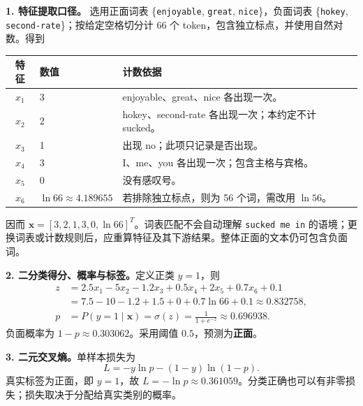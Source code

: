 \begin{checkedsolution}
\textbf{1. 特征提取口径。}
选用正面词表 \{\texttt{enjoyable}, \texttt{great}, \texttt{nice}\}，负面词表 \{\texttt{hokey}, \texttt{second-rate}\}；按给定空格切分计 66 个 token，包含独立标点，并使用自然对数。得到
\begin{center}
\small
\begin{tabularx}{\textwidth}{@{}c l X@{}}
\toprule
特征 & 数值 & 计数依据 \\
\midrule
$x_1$ & 3 & enjoyable、great、nice 各出现一次。\\
$x_2$ & 2 & hokey、second-rate 各出现一次；本约定不计 sucked。\\
$x_3$ & 1 & 出现 no；此项只记录是否出现。\\
$x_4$ & 3 & I、me、you 各出现一次；包含主格与宾格。\\
$x_5$ & 0 & 没有感叹号。\\
$x_6$ & $\ln66\approx4.189655$ & 若排除独立标点，则为 56 个词，需改用 $\ln56$。\\
\bottomrule
\end{tabularx}
\end{center}
因而 $\mathbf x=[3,2,1,3,0,\ln66]^T$。词表匹配不会自动理解 \texttt{sucked me in} 的语境；更换词表或计数规则后，应重算特征及其下游结果。整体正面的文本仍可包含负面词。

\textbf{2. 二分类得分、概率与标签。}定义正类 $y=1$，则
\begin{align*}
 z&=2.5x_1-5x_2-1.2x_3+0.5x_4+2x_5+0.7x_6+0.1\\
  &=7.5-10-1.2+1.5+0+0.7\ln66+0.1
   \approx0.832758,\\
 p&=P(y=1\mid\mathbf x)=\sigma(z)=\frac1{1+e^{-z}}
   \approx0.696938.
\end{align*}
负面概率为 $1-p\approx0.303062$。采用阈值 $0.5$，预测为\textbf{正面}。

\textbf{3. 二元交叉熵。}单样本损失为
\[
 L=-y\ln p-(1-y)\ln(1-p).
\]
真实标签为正面，即 $y=1$，故 $\boxed{L=-\ln p\approx0.361059}$。分类正确也可以有非零损失；损失取决于分配给真实类别的概率。


\end{checkedsolution}
